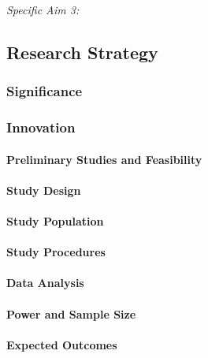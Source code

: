 \emph{Specific Aim 3:}


\subsection{Research Strategy}\label{research-strategy}


\subsubsection{Significance}\label{significance}

\subsubsection{Innovation}\label{innovation}

\begin{enumerate}
      \paragraph{Preliminary Studies and
      Feasibility}\label{preliminary-studies-and-feasibility}

\paragraph{Study Design}\label{study-design}

\paragraph{Study Population}\label{study-population}

\paragraph{Study Procedures}\label{study-procedures}

\paragraph{Data Analysis}\label{data-analysis}

\paragraph{Power and Sample Size}\label{power-and-sample-size}

\paragraph{Expected Outcomes}\label{expected-outcomes}


\end{enumerate}
